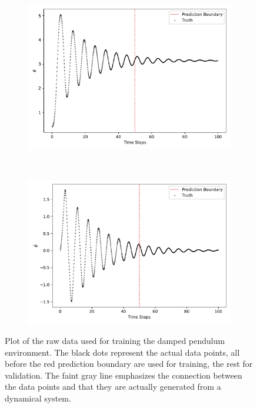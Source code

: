 		\begin{figure}
			\centering
			\begin{subfigure}{0.5\linewidth}
				\centering
				\includegraphics[width=\linewidth]{figures/experiments/environments/observations-pendulum-damped-N0-D0.pdf}
			\end{subfigure}%
			~
			\begin{subfigure}{0.5\linewidth}
				\centering
				\includegraphics[width=\linewidth]{figures/experiments/environments/observations-pendulum-damped-N0-D1.pdf}
			\end{subfigure}
			\caption{Plot of the raw data used for training the damped pendulum environment. The black dots represent the actual data points, all before the red prediction boundary are used for training, the rest for validation. The faint gray line emphasizes the connection between the data points and that they are actually generated from a dynamical system.}
			\label{fig:envPendulumDamped}
		\end{figure}

